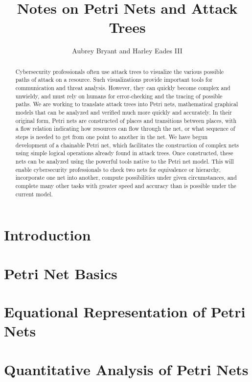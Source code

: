 \documentclass{article}
\title{Notes on Petri Nets and Attack Trees}
\author{Aubrey Bryant and Harley Eades III}
\begin{document}
\maketitle 

\begin{abstract}
  Cybersecurity professionals often use attack trees to visualize the various possible paths of attack on a resource. Such visualizations provide important tools for communication and threat analysis. However, they can quickly become complex and unwieldy, and must rely on humans for error-checking and the tracing of possible paths. We are working to translate attack trees into Petri nets, mathematical graphical models that can be analyzed and verified much more quickly and accurately. In their original form, Petri nets are constructed of places and transitions between places, with a flow relation indicating how resources can flow through the net, or what sequence of steps is needed to get from one point to another in the net. We have begun development of a chainable Petri net, which facilitates the construction of complex nets using simple logical operations already found in attack trees. Once constructed, these nets can be analyzed using the powerful tools native to the Petri net model. This will enable cybersecurity professionals to check two nets for equivalence or hierarchy, incorporate one net into another, compute possibilities under given circumstances, and complete many other tasks with greater speed and accuracy than is possible under the current model.
\end{abstract}
\section{Introduction}

\section{Petri Net Basics}

\section{Equational Representation of Petri Nets}

\section{Quantitative Analysis of Petri Nets}

\nocite{*}


\end{document}
